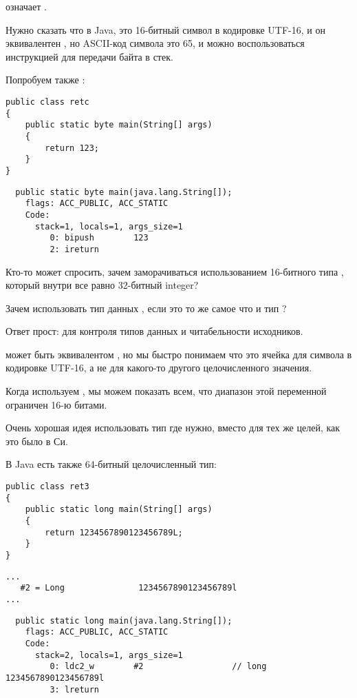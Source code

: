 означает .

Нужно сказать что  в Java, это 16-битный символ в кодировке UTF-16,
и он эквивалентен , но ASCII-код символа  это 65, и можно воспользоваться
инструкцией для передачи байта в стек.

Попробуем также :

\begin{lstlisting}
public class retc
{
	public static byte main(String[] args) 
	{
		return 123;
	}
}
\end{lstlisting}

\begin{lstlisting}
  public static byte main(java.lang.String[]);
    flags: ACC_PUBLIC, ACC_STATIC
    Code:
      stack=1, locals=1, args_size=1
         0: bipush        123
         2: ireturn       
\end{lstlisting}

Кто-то может спросить, зачем заморачиваться использованием 16-битного типа , который
внутри все равно 32-битный integer?

Зачем использовать тип данных , если это то же самое что и тип ?

Ответ прост: для контроля типов данных и читабельности исходников.

 может быть эквивалентом , но мы быстро понимаем что это ячейка
для символа в кодировке UTF-16, а не для какого-то другого целочисленного значения.

Когда используем , мы можем показать всем, что диапазон этой переменной 
ограничен 16-ю битами.

Очень хорошая идея использовать тип  где нужно, 
вместо  для тех же целей, как это было в Си.

В Java есть также 64-битный целочисленный тип:

\begin{lstlisting}
public class ret3
{
	public static long main(String[] args)
	{
		return 1234567890123456789L;
	}
}
\end{lstlisting}

\begin{lstlisting}[caption=Constant pool]
...
   #2 = Long               1234567890123456789l
...
\end{lstlisting}

\begin{lstlisting}
  public static long main(java.lang.String[]);
    flags: ACC_PUBLIC, ACC_STATIC
    Code:
      stack=2, locals=1, args_size=1
         0: ldc2_w        #2                  // long 1234567890123456789l
         3: lreturn       
\end{lstlisting}

